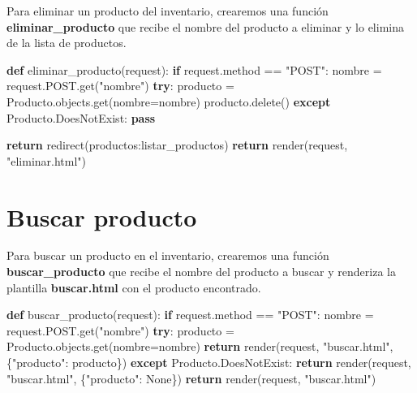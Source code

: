 \documentclass[
  a4paper,
  DIV=11,
  numbers=noendperiod,
  onepage,
  openany]{scrreprt}
\newenvironment{Shaded}{\begin{snugshade}}{\end{snugshade}}
\newcommand{\ControlFlowTok}[1]{\textcolor[rgb]{0.00,0.23,0.31}{\textbf{#1}}}
\newcommand{\KeywordTok}[1]{\textcolor[rgb]{0.00,0.23,0.31}{\textbf{#1}}}
\newcommand{\NormalTok}[1]{\textcolor[rgb]{0.00,0.23,0.31}{#1}}
\newcommand{\OperatorTok}[1]{\textcolor[rgb]{0.37,0.37,0.37}{#1}}
\newcommand{\StringTok}[1]{\textcolor[rgb]{0.13,0.47,0.30}{#1}}
\newcommand{\VariableTok}[1]{\textcolor[rgb]{0.07,0.07,0.07}{#1}}
\begin{document}
\begin{tcolorbox}
Para eliminar un producto del inventario, crearemos una función
\textbf{eliminar\_producto} que recibe el nombre del producto a eliminar
y lo elimina de la lista de productos.

\begin{Shaded}
\begin{Highlighting}[]
\KeywordTok{def}\NormalTok{ eliminar\_producto(request):}
    \ControlFlowTok{if}\NormalTok{ request.method }\OperatorTok{==} \StringTok{"POST"}\NormalTok{:}
\NormalTok{        nombre }\OperatorTok{=}\NormalTok{ request.POST.get(}\StringTok{"nombre"}\NormalTok{)}
        \ControlFlowTok{try}\NormalTok{:}
\NormalTok{            producto }\OperatorTok{=}\NormalTok{ Producto.objects.get(nombre}\OperatorTok{=}\NormalTok{nombre)}
\NormalTok{            producto.delete()}
        \ControlFlowTok{except}\NormalTok{ Producto.DoesNotExist:}
            \ControlFlowTok{pass}
        
        \ControlFlowTok{return}\NormalTok{ redirect(}\StringTok{\textquotesingle{}productos:listar\_productos\textquotesingle{}}\NormalTok{)}
    \ControlFlowTok{return}\NormalTok{ render(request, }\StringTok{"eliminar.html"}\NormalTok{)}
\end{Highlighting}
\end{Shaded}

\section{Buscar producto}\label{buscar-producto}

Para buscar un producto en el inventario, crearemos una función
\textbf{buscar\_producto} que recibe el nombre del producto a buscar y
renderiza la plantilla \textbf{buscar.html} con el producto encontrado.

\begin{Shaded}
\begin{Highlighting}[]
\KeywordTok{def}\NormalTok{ buscar\_producto(request):}
    \ControlFlowTok{if}\NormalTok{ request.method }\OperatorTok{==} \StringTok{"POST"}\NormalTok{:}
\NormalTok{        nombre }\OperatorTok{=}\NormalTok{ request.POST.get(}\StringTok{"nombre"}\NormalTok{)}
        \ControlFlowTok{try}\NormalTok{:}
\NormalTok{            producto }\OperatorTok{=}\NormalTok{ Producto.objects.get(nombre}\OperatorTok{=}\NormalTok{nombre)}
            \ControlFlowTok{return}\NormalTok{ render(request, }\StringTok{"buscar.html"}\NormalTok{, \{}\StringTok{"producto"}\NormalTok{: producto\})}
        \ControlFlowTok{except}\NormalTok{ Producto.DoesNotExist:}
            \ControlFlowTok{return}\NormalTok{ render(request, }\StringTok{"buscar.html"}\NormalTok{, \{}\StringTok{"producto"}\NormalTok{: }\VariableTok{None}\NormalTok{\})}
    \ControlFlowTok{return}\NormalTok{ render(request, }\StringTok{"buscar.html"}\NormalTok{)}
\end{Highlighting}
\end{Shaded}


\end{tcolorbox}
\end{document}
